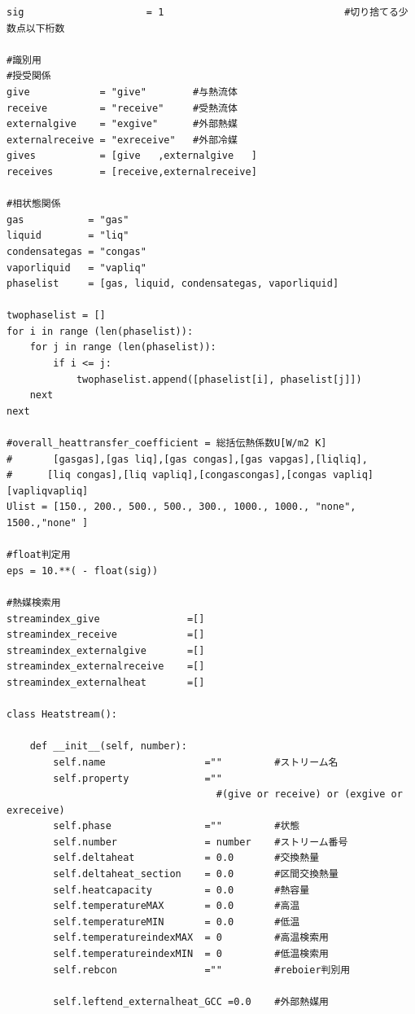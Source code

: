 \documentclass[a4j]{jsreport}
\begin{document}
\begin{lstlisting}[caption=グランドコンポジットカーブおよびTQ線図を書くコード]
sig                     = 1                               #切り捨てる少数点以下桁数

#識別用
#授受関係
give            = "give"        #与熱流体
receive         = "receive"     #受熱流体
externalgive    = "exgive"      #外部熱媒
externalreceive = "exreceive"   #外部冷媒
gives           = [give   ,externalgive   ]
receives        = [receive,externalreceive]

#相状態関係
gas           = "gas"
liquid        = "liq"
condensategas = "congas"
vaporliquid   = "vapliq"
phaselist     = [gas, liquid, condensategas, vaporliquid]

twophaselist = []
for i in range (len(phaselist)):
    for j in range (len(phaselist)):
        if i <= j:
            twophaselist.append([phaselist[i], phaselist[j]])
    next
next

#overall_heattransfer_coefficient = 総括伝熱係数U[W/m2 K]
#       [gasgas],[gas liq],[gas congas],[gas vapgas],[liqliq],
#      [liq congas],[liq vapliq],[congascongas],[congas vapliq][vapliqvapliq]
Ulist = [150., 200., 500., 500., 300., 1000., 1000., "none", 1500.,"none" ]

#float判定用
eps = 10.**( - float(sig))

#熱媒検索用
streamindex_give               =[]
streamindex_receive            =[]
streamindex_externalgive       =[]
streamindex_externalreceive    =[]
streamindex_externalheat       =[]

class Heatstream():

    def __init__(self, number):
        self.name                 =""         #ストリーム名
        self.property             =""
                                    #(give or receive) or (exgive or exreceive)
        self.phase                =""         #状態
        self.number               = number    #ストリーム番号
        self.deltaheat            = 0.0       #交換熱量
        self.deltaheat_section    = 0.0       #区間交換熱量
        self.heatcapacity         = 0.0       #熱容量
        self.temperatureMAX       = 0.0       #高温
        self.temperatureMIN       = 0.0       #低温
        self.temperatureindexMAX  = 0         #高温検索用
        self.temperatureindexMIN  = 0         #低温検索用
        self.rebcon               =""         #reboier判別用

        self.leftend_externalheat_GCC =0.0    #外部熱媒用


\end{lstlisting}
\end{document}
